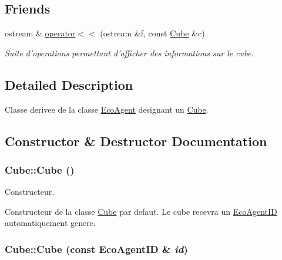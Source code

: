 \subsection*{Friends}
\begin{CompactItemize}
\item 
\hypertarget{classCube_73f4a43d36e6b84403eceeebfdf68c56}{
ostream \& \hyperlink{classCube_73f4a43d36e6b84403eceeebfdf68c56}{operator$<$$<$} (ostream \&f, const \hyperlink{classCube}{Cube} \&c)}
\label{classCube_73f4a43d36e6b84403eceeebfdf68c56}

\begin{CompactList}\small\item\em Suite d'operations permettant d'afficher des informations sur le cube. \item\end{CompactList}\end{CompactItemize}


\subsection{Detailed Description}
Classe derivee de la classe \hyperlink{classEcoAgent}{EcoAgent} designant un \hyperlink{classCube}{Cube}. 

\subsection{Constructor \& Destructor Documentation}
\hypertarget{classCube_06f3d86fb63e3aad08623610aa3c17b4}{
\subsubsection[{Cube}]{\setlength{\rightskip}{0pt plus 5cm}Cube::Cube ()}}
\label{classCube_06f3d86fb63e3aad08623610aa3c17b4}


Constructeur. 

Constructeur de la classe \hyperlink{classCube}{Cube} par defaut. Le cube recevra un \hyperlink{classEcoAgentID}{EcoAgentID} automatiquement genere. \hypertarget{classCube_4793068a114fd49b51233e8f81884189}{
\subsubsection[{Cube}]{\setlength{\rightskip}{0pt plus 5cm}Cube::Cube (const {\bf EcoAgentID} \& {\em id})}}
\label{classCube_4793068a114fd49b51233e8f81884189}


